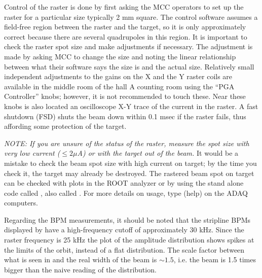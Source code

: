Control of the raster is done by first asking the MCC
operators to set up the raster for a particular size
typically 2 mm square.
The control software assumes a field-free region between
the raster and the target, so it is only approximately
correct because there are several quadrupoles in this region.
It is important to check the raster spot size and
make adjustments if necessary.  The adjustment is made
by asking MCC to change the size and noting the 
linear relationship between what their software says
the size is and the actual size.
Relatively small independent adjustments to the 
gains on the X and the Y raster
coils are available in the middle room of the hall A
counting room using the ``PGA Controller'' knobs;
however, it is not recommended to touch these.
Near these knobs is also located an oscilloscope X-Y trace
of the current in the raster.  A fast shutdown (FSD) shuts
the beam down within 0.1 msec if the raster fails, thus
affording some protection of the target.

{\it NOTE:  If you are unsure of the status of the raster,
measure the spot size with very low current ($\le 2 \mu$A) or with
the target out of the beam.}  It would be a mistake
to check the beam spot size with high current on target; by
the time you check it, the target may already be destroyed.
The rastered beam spot on target can be checked with
plots in the ROOT analyzer or by 
using the stand alone code called ,
also called .
For more details on usage, type  (help)
on the ADAQ computers.

Regarding the BPM measurements, it should be noted that 
the stripline BPMs displayed by  have a high-frequency 
cutoff of approximately 30 kHz.  Since the raster frequency is 25 kHz
the plot of the amplitude distribution shows spikes at the 
limits of the orbit, instead of a flat distribution.  The scale
factor between what is seen in  and the real width of the beam
is $\sim 1.5$, i.e. the beam is 1.5 times bigger than the naive
reading of the  distribution.


